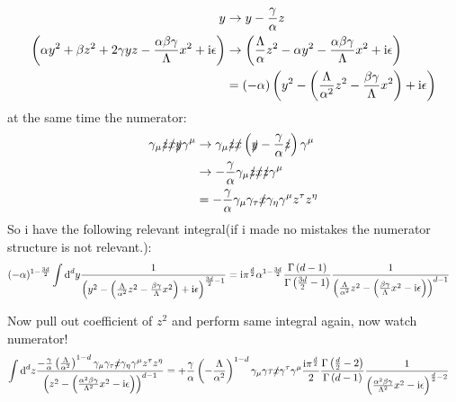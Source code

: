 \begin{align}
	y 
	&\rightarrow 
	y - \frac{\gamma}{\alpha} z
	\\
	\left( \alpha y^2 + \beta z^2 + 2\gamma yz -\frac{\alpha\beta\gamma}{\Lambda} x^2 + \text{i} \epsilon \right)
	&\rightarrow 
	\left( \frac{\Lambda}{\alpha}z^2 - \alpha y^2 - \frac{\alpha\beta\gamma}{\Lambda} x^2 +\text{i} \epsilon\right)
	\\
	&=
	(-\alpha) \left( y^2 - \left( \frac{\Lambda}{\alpha^2}z^2- \frac{\beta\gamma}{\Lambda}x^2\right)+\text{i} \epsilon\right)
\end{align}
at the same time the numerator:
\begin{align}
	\gamma_\mu \slashed z \slashed x \slashed y \gamma^\mu
	&\rightarrow 
	\gamma_\mu \slashed z \slashed x \left(\slashed y - \frac{\gamma}{\alpha} \slashed z\right) \gamma^\mu
	\\
	&\rightarrow
	- \frac{\gamma}{\alpha} \gamma_\mu \slashed z \slashed x \slashed z \gamma^\mu
	\\
	&=
	- \frac{\gamma}{\alpha} \gamma_\mu \gamma_\tau \slashed x \gamma_\eta \gamma^\mu z^\tau z^\eta
\end{align}
So i have the following relevant integral(if i made no mistakes the numerator structure is not relevant.):
\begin{align}
	(-\alpha)^{1-\frac{3d}{2}}\int \text{d}^d y \frac{1}{\left( y^2 - \left( \frac{\Lambda}{\alpha^2}z^2- \frac{\beta\gamma}{\Lambda}x^2\right)+\text{i} \epsilon\right)^{\frac{3d}{2}-1}}
	&=
	\text{i}\pi^{\frac{d}{2}}\alpha^{1-\frac{3d}{2}}\frac{\Gamma\left(d-1\right)}{\Gamma\left(\frac{3d}{2}-1\right)} \frac{1}{\left(\frac{\Lambda}{\alpha^2}z^2 -\left(\frac{\beta\gamma}{\Lambda}x^2 -\text{i} \epsilon\right)\right)^{d-1}}
\end{align}

Now pull out coefficient of $z^2$ and perform same integral again, now watch numerator!
\begin{align}
	\int\text{d} ^d z \frac{-\frac{\gamma}{\alpha} \left(\frac{\Lambda}{\alpha^2}\right)^{1-d} \gamma_\mu \gamma_\tau \slashed x \gamma_\eta \gamma^\mu z^\tau z^\eta }{\left(z^2-\left(\frac{\alpha^2\beta\gamma}{\Lambda^2}x^2-\text{i} \epsilon\right)\right)^{d-1}}
	&=
	+\frac{\gamma}{\alpha}\left(-\frac{\Lambda}{\alpha^2}\right)^{1-d} \gamma_\mu \gamma\tau \slashed x \gamma^\tau \gamma^\mu \frac{\text{i} \pi^{\frac{d}{2}}}{2}\frac{\Gamma\left(\frac{d}{2}-2\right)}{\Gamma\left(d-1\right)} \frac{1}{\left(\frac{\alpha^2\beta\gamma}{\Lambda^2}x^2 -\text{i} \epsilon\right)^{\frac{d}{2}-2}}
\end{align}

